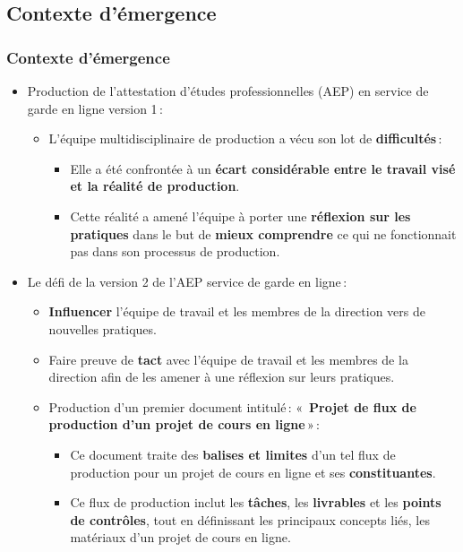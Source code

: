                \subsection{Contexte d'émergence} 
		\begin{frame}[allowframebreaks]
			\frametitle{Contexte d'émergence}
			\begin{itemize}
				\item Production de l'attestation d'études professionnelles (AEP) en service de garde en ligne version 1\,:
                                  \begin{itemize}
                                    \item L’équipe multidisciplinaire de production a vécu son lot de \textbf{difficultés}\,:
                                     	\begin{itemize}
                                    	\item Elle a été confrontée à un \textbf{écart considérable entre le travail visé et la réalité de production}.
                                    	\item Cette réalité a amené l’équipe à porter une \textbf{réflexion sur les pratiques} dans le but de \textbf{mieux comprendre} ce qui ne fonctionnait pas dans son processus de production.
                                    	\end{itemize}
                                  \end{itemize}
                                \framebreak
                                \item Le défi de la version 2 de l'AEP service de garde en ligne\,: 
                                  \begin{itemize}
                                  \item \textbf{Influencer} l’équipe de travail et les membres de la direction vers de nouvelles pratiques.
                                  \item Faire preuve de \textbf{tact} avec l’équipe de travail et les membres de la direction afin de les amener à une réflexion sur leurs pratiques.
                                  \item Production d'un premier document intitulé\,: «\, \textbf{Projet de flux de production d’un projet de cours en ligne}\,»\,:
                                    \begin{itemize}
                                      \item Ce document traite des \textbf{balises et limites} d’un tel flux de production pour un projet de cours en ligne et ses \textbf{constituantes}.
                                      \item Ce flux de production inclut les\textbf{ tâches}, les \textbf{livrables} et les \textbf{points de contrôles}, tout en définissant les principaux concepts liés, les matériaux d’un projet de cours en ligne.
                                         

\end{itemize}
\end{itemize}
\end{itemize}
\end{frame}
